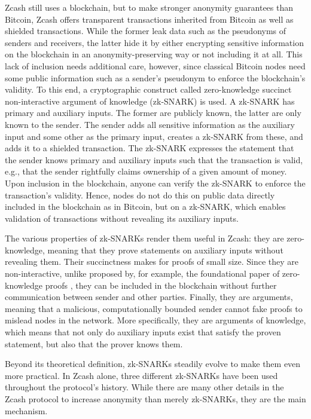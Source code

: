 \documentclass{article}
\begin{document}
Zcash still uses a blockchain, but to make stronger anonymity guarantees than Bitcoin, Zcash offers transparent transactions inherited from Bitcoin as well as shielded transactions.
While the former leak data such as the pseudonyms of senders and receivers, the latter hide it by either encrypting sensitive information on the blockchain in an anonymity-preserving way or not including it at all.
This lack of inclusion needs additional care, however, since classical Bitcoin nodes need some public information such as a sender's pseudonym to enforce the blockchain's validity.
To this end, a cryptographic construct called zero-knowledge succinct non-interactive argument of knowledge (zk-SNARK) is used.
A zk-SNARK has primary and auxiliary inputs.
The former are publicly known, the latter are only known to the sender.
The sender adds all sensitive information as the auxiliary input and some other as the primary input, creates a zk-SNARK from these, and adds it to a shielded transaction.
The zk-SNARK expresses the statement that the sender knows primary and auxiliary inputs such that the transaction is valid, e.g., that the sender rightfully claims ownership of a given amount of money.
Upon inclusion in the blockchain, anyone can verify the zk-SNARK to enforce the transaction's validity.
Hence, nodes do not do this on public data directly included in the blockchain as in Bitcoin, but on a zk-SNARK, which enables validation of transactions without revealing its auxiliary inputs.

The various properties of zk-SNARKs render them useful in Zcash: they are zero-knowledge, meaning that they prove statements on auxiliary inputs without revealing them.
Their succinctness makes for proofs of small size.
Since they are non-interactive, unlike proposed by, for example, the foundational paper of zero-knowledge proofs \cite{goldwasser:zk}, they can be included in the blockchain without further communication between sender and other parties.
Finally, they are arguments, meaning that a malicious, computationally bounded sender cannot fake proofs to mislead nodes in the network.
More specifically, they are arguments of knowledge, which means that not only do auxiliary inputs exist that satisfy the proven statement, but also that the prover knows them.

Beyond its theoretical definition, zk-SNARKs steadily evolve to make them even more practical.
In Zcash alone, three different zk-SNARKs \cite{bensasson:zksnark} \cite{groth:zksnark} \cite{hopwood:zcash} have been used throughout the protocol's history.
While there are many other details in the Zcash protocol to increase anonymity than merely zk-SNARKs, they are the main mechanism.
\end{document}
